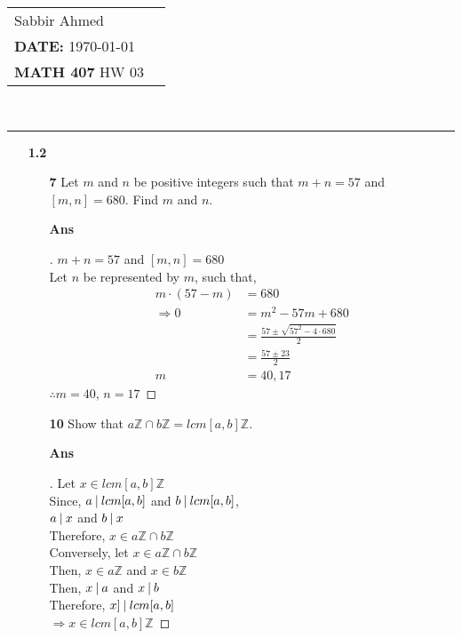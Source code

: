 \documentclass[paper=usletter, fontsize=12pt]{article}
\newcommand{\documentinfo}[5]{
    \begin{centering}
        \parbox{2in}{
        \begin{spacing}{1}
            \begin{flushleft}
                \begin{tabular}{l l}
                    #1 \\
                    #2 \\
                    #3 \\
                \end{tabular}\\
                \rule{\textwidth}{1pt}
            \end{flushleft}
        \end{spacing}
        }
    \end{centering}
}
\begin{document}
    \documentinfo{Sabbir Ahmed}{\textbf{DATE:} \today}{\textbf{MATH 407} HW 03}
    \vspace{-0.2in}

    \begin{itemize}

        \item[\textbf{1.2}]

        \begin{itemize}

            \item[\textbf{7}] Let $m$ and $n$ be positive integers such that $m
            + n = 57$ and $[m, n] = 680$. Find $m$ and $n$.
            \item[\textbf{Ans}]
            \begin{proof}[\unskip\nopunct]
                $m + n = 57$ and $[m, n] = 680$\\
                Let $n$ be represented by $m$, such that,
                \begingroup
                \addtolength{\jot}{1em}
                \begin{align*}
                    m \cdot (57 - m) & = 680\\
                    \Rightarrow 0 & = m^2 - 57m + 680\\
                    & = \frac{57 \pm \sqrt{57^2-4\cdot 680}}{2}\\
                    & = \frac{57 \pm 23}{2}\\
                    m & = 40, 17
                \end{align*}
                \endgroup
                $\therefore m = 40$, $n = 17$ \qedhere
            \end{proof}
            \vspace{0.2in}

            \item[\textbf{10}] Show that $a\mathbb{Z} \cap b\mathbb{Z} = lcm[a,
            b]\mathbb{Z}$.
            \item[\textbf{Ans}]
            \begin{proof}[\unskip\nopunct]
                Let $x \in lcm[a,b]\mathbb{Z}$\\
                Since, $a \:\vert\: lcm[a,b]$ and $b \:\vert\: lcm[a,b]$,\\
                $a \:\vert\: x$ and $b \:\vert\: x$\\
                Therefore, $x \in a\mathbb{Z} \cap b\mathbb{Z}$\\

                Conversely, let $x \in a\mathbb{Z} \cap b\mathbb{Z}$\\
                Then, $x \in a\mathbb{Z}$ and $x \in b\mathbb{Z}$\\
                Then, $x \:\vert\: a$ and $x \:\vert\: b$\\
                Therefore, $x ]\:\vert\: lcm[a,b]$\\
                $\Rightarrow x \in lcm[a,b]\mathbb{Z}$
            \end{proof}
            \vspace{0.2in}


\end{itemize}
\end{itemize}
\end{document}
